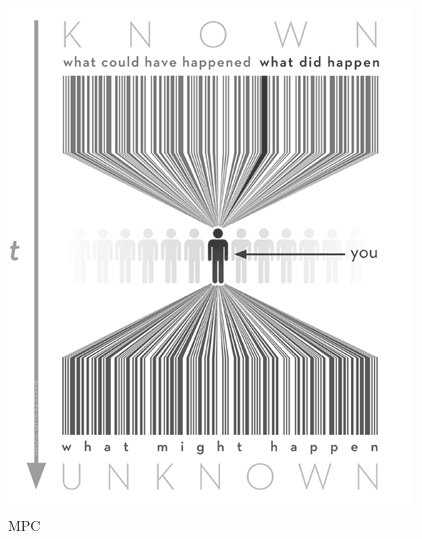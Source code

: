 \documentclass{article}
\begin{document}
    \begin{figure}[h!]
        \centering
        \includegraphics[width=.5\textwidth]{./figs/mpc/mpc.png}
        \caption{MPC}
        \label{fig:mpc_futurism}
    \end{figure}
\end{document}
